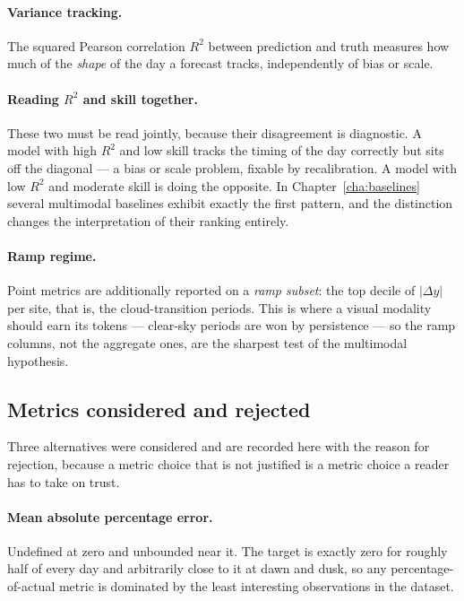 \paragraph{Variance tracking.} The squared Pearson correlation $R^2$ between prediction and
truth measures how much of the \emph{shape} of the day a forecast tracks, independently of
bias or scale.

\paragraph{Reading $R^2$ and skill together.} These two must be read jointly, because their
disagreement is diagnostic. A model with high $R^2$ and low skill tracks the timing of the
day correctly but sits off the diagonal --- a bias or scale problem, fixable by
recalibration. A model with low $R^2$ and moderate skill is doing the opposite. In
Chapter~\ref{cha:baselines} several multimodal baselines exhibit exactly the first pattern,
and the distinction changes the interpretation of their ranking entirely.

\paragraph{Ramp regime.} Point metrics are additionally reported on a \emph{ramp subset}:
the top decile of $|\Delta y|$ per site, that is, the cloud-transition periods. This is
where a visual modality should earn its tokens --- clear-sky periods are won by persistence
--- so the ramp columns, not the aggregate ones, are the sharpest test of the multimodal
hypothesis.

\subsection{Metrics considered and rejected}

Three alternatives were considered and are recorded here with the reason for rejection,
because a metric choice that is not justified is a metric choice a reader has to take on
trust.

\paragraph{Mean absolute percentage error.} Undefined at zero and unbounded near it. The
target is exactly zero for roughly half of every day and arbitrarily close to it at dawn and
dusk, so any percentage-of-actual metric is dominated by the least interesting observations
in the dataset.

